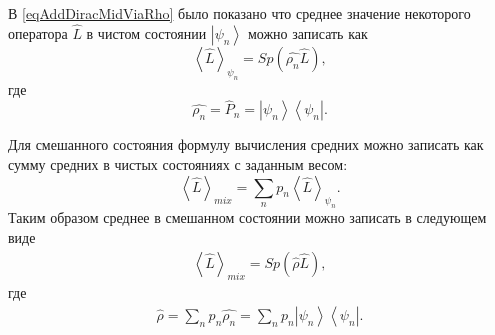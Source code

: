 В \ref{eqAddDiracMidViaRho} было показано что среднее значение
некоторого оператора \(\hat{L}\) в чистом состоянии 
\(\left|\psi_n\right>\) можно записать как
\[
\left< \hat{L} \right>_{\psi_n} = Sp \left(\hat{\rho_n} \hat{L} \right),
\]
где
\[
\hat{\rho_n} = \hat{P}_n = \left|\psi_n\right>\left<\psi_n\right|.
\]

Для смешанного состояния формулу вычисления средних можно записать
как сумму средних в чистых состояниях с заданным весом:
\[
\left< \hat{L} \right>_{mix} = \sum_n p_n \left< \hat{L}
\right>_{\psi_n}. 
\]
Таким образом среднее в смешанном состоянии можно записать в следующем
виде 
\begin{eqnarray}
\left< \hat{L} \right>_{mix} = Sp \left(\hat{\rho} \hat{L} \right),
\end{eqnarray}
где
\begin{eqnarray}
\hat{\rho} = \sum_n p_n \hat{\rho_n} = 
\sum_n p_n \left|\psi_n\right>\left<\psi_n\right|.
\end{eqnarray}



